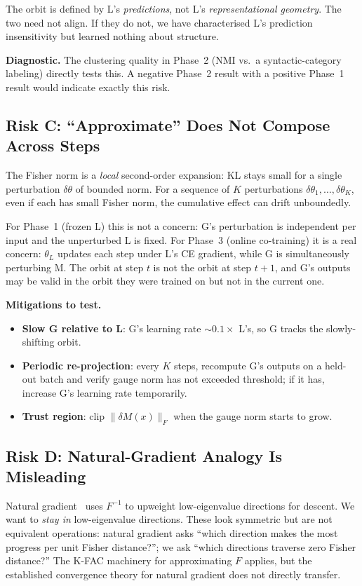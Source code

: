 \documentclass[11pt, a4paper]{article}
\theoremstyle{plain}
\theoremstyle{definition}
\theoremstyle{remark}
\begin{document}
The orbit is defined by L's \emph{predictions}, not L's \emph{representational geometry}.
The two need not align.
If they do not, we have characterised L's prediction insensitivity but learned nothing about structure.

\textbf{Diagnostic.} The clustering quality in Phase~2 (NMI vs.\ a syntactic-category labeling) directly tests this.
A negative Phase~2 result with a positive Phase~1 result would indicate exactly this risk.

\subsection{Risk C: ``Approximate'' Does Not Compose Across Steps}

The Fisher norm is a \emph{local} second-order expansion: KL stays small for a single perturbation $\delta\theta$ of bounded norm.
For a sequence of $K$ perturbations $\delta\theta_{1}, \ldots, \delta\theta_{K}$, even if each has small Fisher norm, the cumulative effect can drift unboundedly.

For Phase~1 (frozen L) this is not a concern: G's perturbation is independent per input and the unperturbed L is fixed.
For Phase~3 (online co-training) it is a real concern: $\theta_{L}$ updates each step under L's CE gradient, while G is simultaneously perturbing M.
The orbit at step $t$ is not the orbit at step $t+1$, and G's outputs may be valid in the orbit they were trained on but not in the current one.

\textbf{Mitigations to test.}
\begin{itemize}[nosep]
\item \textbf{Slow G relative to L}: G's learning rate $\sim 0.1\times$ L's, so G tracks the slowly-shifting orbit.
\item \textbf{Periodic re-projection}: every $K$ steps, recompute G's outputs on a held-out batch and verify gauge norm has not exceeded threshold; if it has, increase G's learning rate temporarily.
\item \textbf{Trust region}: clip $\|\delta M(x)\|_{F}$ when the gauge norm starts to grow.
\end{itemize}

\subsection{Risk D: Natural-Gradient Analogy Is Misleading}

Natural gradient~\cite{amari1998natural} uses $F^{-1}$ to upweight low-eigenvalue directions for descent.
We want to \emph{stay in} low-eigenvalue directions.
These look symmetric but are not equivalent operations: natural gradient asks ``which direction makes the most progress per unit Fisher distance?''; we ask ``which directions traverse zero Fisher distance?''
The K-FAC machinery for approximating $F$ applies, but the established convergence theory for natural gradient does not directly transfer.
\end{document}
